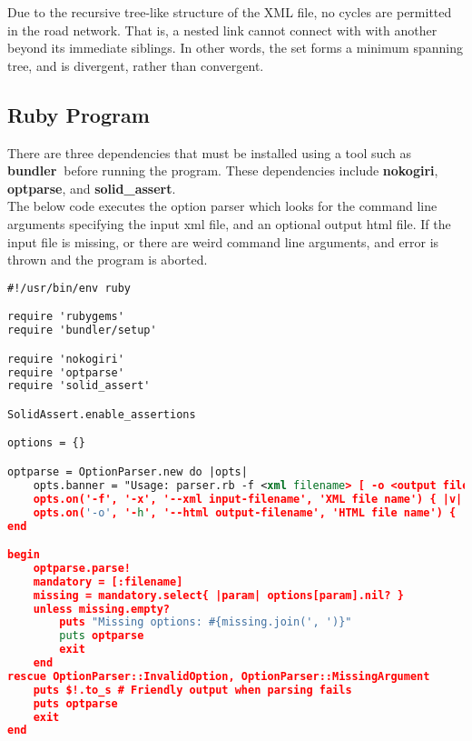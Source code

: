 \documentclass{article}
\begin{document}
Due to the recursive tree-like structure of the XML file, no cycles are permitted in the road network. That is, a nested link cannot connect with with another beyond its immediate siblings. In other words, the set forms a minimum spanning tree, and is divergent, rather than convergent.\\

\subsection{Ruby Program}

There are three dependencies that must be installed using a tool such as \textbf{bundler}\textbf\ before running the program. These dependencies include \textbf{nokogiri},  \textbf{optparse}, and \textbf{solid\_assert}.\\

The below code executes the option parser which looks for the command line arguments specifying the input xml file, and an optional output html file. If the input file is missing, or there are weird command line arguments, and error is thrown and the program is aborted.\\

\begin{lstlisting}[language=xml]
#!/usr/bin/env ruby

require 'rubygems'
require 'bundler/setup'

require 'nokogiri'
require 'optparse'
require 'solid_assert'

SolidAssert.enable_assertions

options = {}

optparse = OptionParser.new do |opts|
	opts.banner = "Usage: parser.rb -f <xml filename> [ -o <output filename> ]"
	opts.on('-f', '-x', '--xml input-filename', 'XML file name') { |v| options[:filename] = v }
	opts.on('-o', '-h', '--html output-filename', 'HTML file name') { |v| options[:output] = v }
end

begin
	optparse.parse!
	mandatory = [:filename]
	missing = mandatory.select{ |param| options[param].nil? }
	unless missing.empty?     
		puts "Missing options: #{missing.join(', ')}"  
		puts optparse                                    
		exit               
	end  
rescue OptionParser::InvalidOption, OptionParser::MissingArgument 
	puts $!.to_s # Friendly output when parsing fails
	puts optparse                                                     
	exit      
end
\end{lstlisting}
\end{document}
